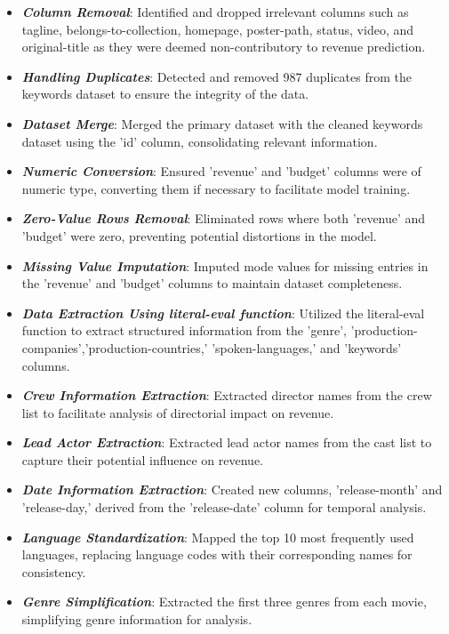 \documentclass[conference]{IEEEtran}
\begin{document}
\begin{itemize}
    \item \textbf{\textit{Column Removal}}: Identified and dropped irrelevant columns such as tagline, belongs-to-collection, homepage, poster-path, status, video, and original-title as they were deemed non-contributory to revenue prediction.
    \item \textbf{\textit{Handling Duplicates}}: Detected and removed 987 duplicates from the keywords dataset to ensure the integrity of the data.
    \item \textbf{\textit{Dataset Merge}}: Merged the primary dataset with the cleaned keywords dataset using the 'id' column, consolidating relevant information.
    \item \textbf{\textit{Numeric Conversion}}: Ensured 'revenue' and 'budget' columns were of numeric type, converting them if necessary to facilitate model training.
    \item \textbf{\textit{Zero-Value Rows Removal}}: Eliminated rows where both 'revenue' and 'budget' were zero, preventing potential distortions in the model.
    \item \textbf{\textit{Missing Value Imputation}}: Imputed mode values for missing entries in the 'revenue' and 'budget' columns to maintain dataset completeness.
    \item \textbf{\textit{Data Extraction Using literal-eval function}}: Utilized the literal-eval function to extract structured information from the 'genre', 'production-companies','production-countries,' 'spoken-languages,' and 'keywords' columns.
    \item \textbf{\textit{Crew Information Extraction}}: Extracted director names from the crew list to facilitate analysis of directorial impact on revenue.
    \item \textbf{\textit{Lead Actor Extraction}}: Extracted lead actor names from the cast list to capture their potential influence on revenue.
    \item \textbf{\textit{Date Information Extraction}}: Created new columns, 'release-month' and 'release-day,' derived from the 'release-date' column for temporal analysis.
    \item \textbf{\textit{Language Standardization}}: Mapped the top 10 most frequently used languages, replacing language codes with their corresponding names for consistency.
    \item \textbf{\textit{Genre Simplification}}: Extracted the first three genres from each movie, simplifying genre information for analysis.

\end{itemize}
\end{document}
